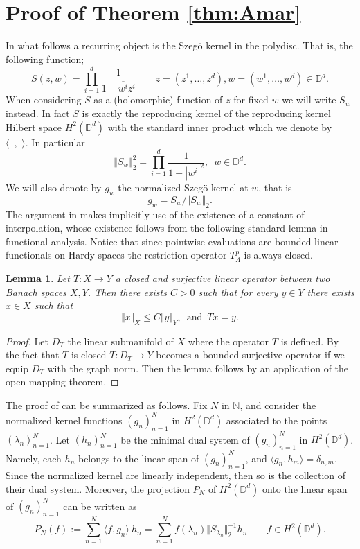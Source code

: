 \documentclass{amsart}
\numberwithin{equation}{section}
\newtheorem{lem}[thm]{Lemma}
\begin{document}
\section{Proof of Theorem \ref{thm:Amar}}
\label{sec:amar}
In what follows a recurring object is the Szeg\"o kernel in the polydisc.
That is, the following function; 
\begin{equation}
\label{eqn:szego}
S(z,w) = \prod_{i=1}^d\frac{1}{1-\overline{w^i}z^i} \qquad z=(z^1, \dots,z^d), w=(w^1, \dots, w^d) \in \mathbb{D}^d. 
\end{equation}
When considering $S$ as a (holomorphic) function of $z$ for fixed $w$ we will write $S_w$ instead. 
In fact $S$ is exactly the reproducing kernel of the reproducing kernel Hilbert space
$H^2(\mathbb{D}^d)$ with the standard inner product which we denote by $\langle \,\,\, , \,\, \rangle $. In particular 
\[ \Vert S_w \Vert^2_2 =\prod_{i=1}^d \frac{1}{1-|w^i|^2}, \,\,\, w\in \mathbb{D}^d. \]
We will also denote by $g_w$ the normalized Szeg\"o kernel  at $w$, that is 
\begin{equation}
\label{eqn:normalized_Szego}
g_w = S_w/\Vert S_w\Vert_2.
\end{equation}
The argument in \cite[Theorem 2.2]{Amar2020} makes implicitly use of the existence of a constant of interpolation, whose existence follows from the following standard lemma in functional analysis. Notice that since pointwise evaluations are bounded linear functionals on Hardy spaces the restriction operator $T^p_\Lambda$ is always closed. 
\begin{lem}
    \label{lemma:c_int}
    Let $T:X\to Y$ a closed and surjective linear operator between two Banach spaces $X,Y$. Then there exists $C>0$ such that for every $y\in Y$ there exists $x \in X$ such that \[ \Vert x \Vert_X \leq C\Vert y \Vert_Y, \,\,\, \text{and} \,\,\, Tx=y. \]
\end{lem}
\begin{proof} Let $D_T$ the linear submanifold of $X$ where the operator $T$ is defined. By the fact that $T$ is closed $T:D_T \to Y$ becomes a bounded surjective operator if we equip $D_T$ with the graph norm. Then the lemma follows by an application of the open mapping theorem. 
\end{proof}


   The proof of \cite[Theorem 2.2]{Amar2020} can be summarized as follows. Fix $N$ in $\mathbb{N}$, and consider the normalized kernel functions $(g_n)_{n=1}^N$ in $H^2(\mathbb{D}^d)$ associated to the points $(\lambda_n)^N_{n=1}$. Let $(h_n)_{n=1}^N$ be the minimal dual system of $(g_n)_{n=1}^N$ in $H^2(\mathbb{D}^d)$. Namely, each $h_n$ belongs to the linear span of $(g_n)_{n=1}^N$, and $\langle g_n, h_m\rangle=\delta_{n, m}$. Since the normalized kernel are linearly independent, then so is the collection of their dual system. Moreover, the projection $P_N$ of $H^2(\mathbb{D}^d)$ onto the linear span of  $(g_n)_{n=1}^N$ can be written as
\[
P_N(f):=\sum_{n=1}^N\langle f, g_n\rangle~h_n=\sum_{n=1}^N f(\lambda_n) \Vert S_{\lambda_n}\Vert_2 ^{-1} h_n\qquad f\in H^2(\mathbb{D}^d).
\]
\end{document}
